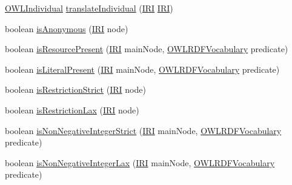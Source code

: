 \begin{DoxyCompactItemize}
\item 
\hyperlink{interfaceorg_1_1semanticweb_1_1owlapi_1_1model_1_1_o_w_l_individual}{O\-W\-L\-Individual} \hyperlink{classorg_1_1coode_1_1owlapi_1_1rdfxml_1_1parser_1_1_abstract_triple_handler_a48a6b8197c54895aff15aadfe2bea1fb}{translate\-Individual} (\hyperlink{classorg_1_1semanticweb_1_1owlapi_1_1model_1_1_i_r_i}{I\-R\-I} \hyperlink{classorg_1_1semanticweb_1_1owlapi_1_1model_1_1_i_r_i}{I\-R\-I})
\item 
boolean \hyperlink{classorg_1_1coode_1_1owlapi_1_1rdfxml_1_1parser_1_1_abstract_triple_handler_aa825f5fa89c8f1314cd38bb4730f5d17}{is\-Anonymous} (\hyperlink{classorg_1_1semanticweb_1_1owlapi_1_1model_1_1_i_r_i}{I\-R\-I} node)
\item 
boolean \hyperlink{classorg_1_1coode_1_1owlapi_1_1rdfxml_1_1parser_1_1_abstract_triple_handler_a3241814b2c8678a2f34304cb313babcd}{is\-Resource\-Present} (\hyperlink{classorg_1_1semanticweb_1_1owlapi_1_1model_1_1_i_r_i}{I\-R\-I} main\-Node, \hyperlink{enumorg_1_1semanticweb_1_1owlapi_1_1vocab_1_1_o_w_l_r_d_f_vocabulary}{O\-W\-L\-R\-D\-F\-Vocabulary} predicate)
\item 
boolean \hyperlink{classorg_1_1coode_1_1owlapi_1_1rdfxml_1_1parser_1_1_abstract_triple_handler_a792e368ed445227c8e2673fadce5161f}{is\-Literal\-Present} (\hyperlink{classorg_1_1semanticweb_1_1owlapi_1_1model_1_1_i_r_i}{I\-R\-I} main\-Node, \hyperlink{enumorg_1_1semanticweb_1_1owlapi_1_1vocab_1_1_o_w_l_r_d_f_vocabulary}{O\-W\-L\-R\-D\-F\-Vocabulary} predicate)
\item 
boolean \hyperlink{classorg_1_1coode_1_1owlapi_1_1rdfxml_1_1parser_1_1_abstract_triple_handler_ad292df1462d5cb6d9c121a3456fd8419}{is\-Restriction\-Strict} (\hyperlink{classorg_1_1semanticweb_1_1owlapi_1_1model_1_1_i_r_i}{I\-R\-I} node)
\item 
boolean \hyperlink{classorg_1_1coode_1_1owlapi_1_1rdfxml_1_1parser_1_1_abstract_triple_handler_a42e13b1c7de40a72667b3071d86d2eea}{is\-Restriction\-Lax} (\hyperlink{classorg_1_1semanticweb_1_1owlapi_1_1model_1_1_i_r_i}{I\-R\-I} node)
\item 
boolean \hyperlink{classorg_1_1coode_1_1owlapi_1_1rdfxml_1_1parser_1_1_abstract_triple_handler_a20517d0ae302080d93d704980f6e6e97}{is\-Non\-Negative\-Integer\-Strict} (\hyperlink{classorg_1_1semanticweb_1_1owlapi_1_1model_1_1_i_r_i}{I\-R\-I} main\-Node, \hyperlink{enumorg_1_1semanticweb_1_1owlapi_1_1vocab_1_1_o_w_l_r_d_f_vocabulary}{O\-W\-L\-R\-D\-F\-Vocabulary} predicate)
\item 
boolean \hyperlink{classorg_1_1coode_1_1owlapi_1_1rdfxml_1_1parser_1_1_abstract_triple_handler_a15c01ea11a81c65666d199061af1961c}{is\-Non\-Negative\-Integer\-Lax} (\hyperlink{classorg_1_1semanticweb_1_1owlapi_1_1model_1_1_i_r_i}{I\-R\-I} main\-Node, \hyperlink{enumorg_1_1semanticweb_1_1owlapi_1_1vocab_1_1_o_w_l_r_d_f_vocabulary}{O\-W\-L\-R\-D\-F\-Vocabulary} predicate)

\end{DoxyCompactItemize}
